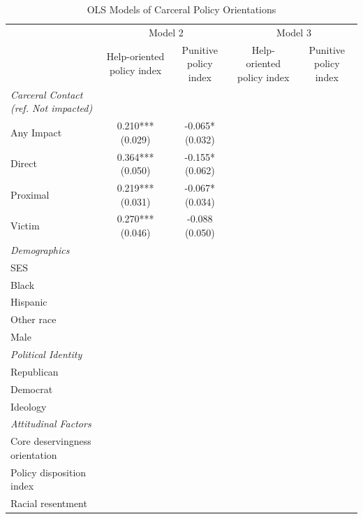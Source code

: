 \begin{table}[!htbp]
\centering
\caption{OLS Models of Carceral Policy Orientations}
\label{tab:carceral\_policy\_orientations}
\begin{threeparttable}
\begin{tabular}{lcccc}
\toprule
 & \multicolumn{2}{c}{Model 2} & \multicolumn{2}{c}{Model 3}
 \\
\cmidrule(lr){2-3} \cmidrule(lr){4-5}
 & Help-oriented policy index & Punitive policy index & Help-oriented policy index & Punitive policy index
 \\
\midrule
\textit{Carceral Contact (ref. Not impacted)} &  &  &  & 
\\
Any Impact & \makecell[c]{0.210*** \\ (0.029)} & \makecell[c]{-0.065* \\ (0.032)} &  &  \\
Direct & \makecell[c]{0.364*** \\ (0.050)} & \makecell[c]{-0.155* \\ (0.062)} &  &  \\
Proximal & \makecell[c]{0.219*** \\ (0.031)} & \makecell[c]{-0.067* \\ (0.034)} &  &  \\
Victim & \makecell[c]{0.270*** \\ (0.046)} & \makecell[c]{-0.088 \\ (0.050)} &  &  \\
\addlinespace
\textit{Demographics} &  &  &  &  \\
SES &  &  &  &  \\
Black &  &  &  &  \\
Hispanic &  &  &  &  \\
Other race &  &  &  &  \\
Male &  &  &  &  \\
\addlinespace
\textit{Political Identity} &  &  &  &  \\
Republican &  &  &  &  \\
Democrat &  &  &  &  \\
Ideology &  &  &  &  \\
\addlinespace
\textit{Attitudinal Factors} &  &  &  &  \\
Core deservingness orientation &  &  &  &  \\
Policy disposition index &  &  &  &  \\
Racial resentment &  &  &  &  \\
\bottomrule
\end{tabular}

\end{threeparttable}
\end{table}
